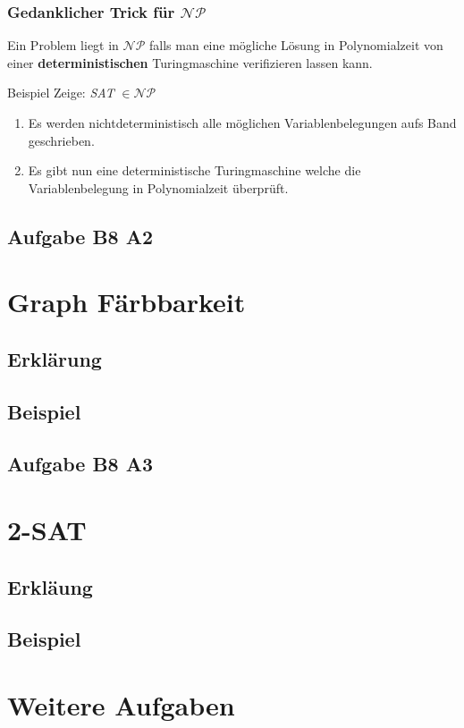\begin{frame}
	\frametitle{Gedanklicher Trick für $\mathcal{NP}$}
	Ein Problem liegt in $\mathcal{NP}$ falls man eine mögliche Lösung in Polynomialzeit von einer \textbf{deterministischen} Turingmaschine verifizieren lassen kann.
	\begin{block}{Beispiel}
		Zeige: \emph{SAT} $\in \mathcal{NP}$
		\begin{enumerate}
			\item Es werden nichtdeterministisch alle möglichen Variablenbelegungen aufs Band geschrieben.
			\item Es gibt nun eine deterministische Turingmaschine welche die Variablenbelegung in Polynomialzeit überprüft.
		\end{enumerate}
	\end{block}
\end{frame}
\subsection{Aufgabe B8 A2}

\section{Graph Färbbarkeit}
\subsection{Erklärung}
\subsection{Beispiel}
\subsection{Aufgabe B8 A3}

\section{2-SAT}
\subsection{Erkläung}
\subsection{Beispiel}

\section{Weitere Aufgaben}
